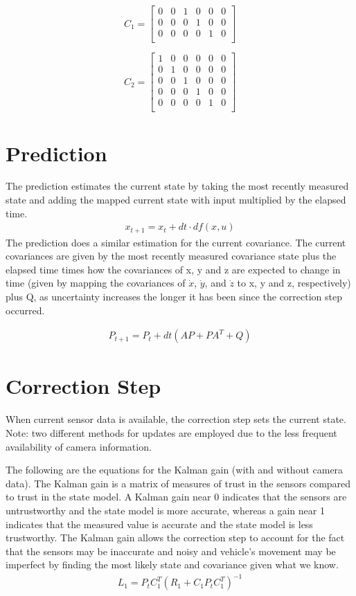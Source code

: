 \documentclass{article}
\begin{document}
\[
	C_1= 
	\left[ {\begin{array}{cccccc}
				0 & 0 & 1 & 0 & 0 & 0\\
				0 & 0 & 0 & 1 & 0 & 0\\
				0 & 0 & 0 & 0 & 1 & 0\\
	\end{array} } \right]
\]

\[
	C_2= 
	\left[ {\begin{array}{cccccc}
				1 & 0 & 0 & 0 & 0 & 0\\
				0 & 1 & 0 & 0 & 0 & 0\\
				0 & 0 & 1 & 0 & 0 & 0\\
				0 & 0 & 0 & 1 & 0 & 0\\
				0 & 0 & 0 & 0 & 1 & 0\\
	\end{array} } \right]
\]

\section{Prediction}
The prediction estimates the current state by taking the most recently measured state and adding the mapped current state with input multiplied by the elapsed time.
\begin{align}
	x_{t+1} = x_t + dt \cdot df(x,u)
\end{align}
The prediction does a similar estimation for the current covariance. The current covariances are given by the most recently measured covariance state plus the elapsed time times how the covariances of x, y and z are expected to change in time (given by mapping the covariances of $\dot x$, $\dot y$, and $\dot z$ to x, y and z, respectively) plus Q, as uncertainty increases the longer it has been since the correction step occurred. %

\begin{align}
	P_{t+1} = P_t + dt(AP + PA^T + Q)
\end{align}

\section{Correction Step}
When current sensor data is available, the correction step sets the current state. Note: two different methods for updates are employed due to the less frequent availability of camera information.

The following are the equations for the Kalman gain (with and without camera data). The Kalman gain is a matrix of measures of trust in the sensors compared to trust in the state model. A Kalman gain near 0 indicates that the sensors are untrustworthy and the state model is more accurate, whereas a gain near 1 indicates that the measured value is accurate and the state model is less trustworthy. The Kalman gain allows the correction step to account for the fact that the sensors may be inaccurate and noisy and vehicle's movement may be imperfect by finding the most likely state and covariance given what we know.
\begin{align}
	L_1 = P_tC_1^T(R_1 + C_1P_tC_1^T)^{-1}
\end{align}
\end{document}
